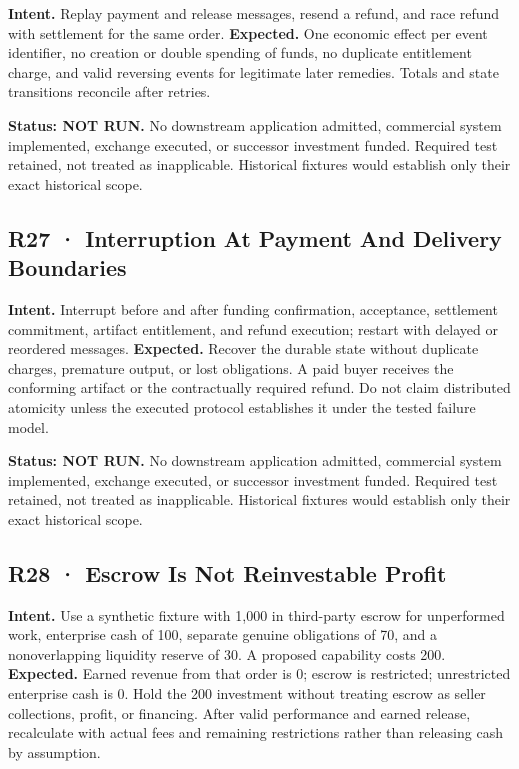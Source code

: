 \documentclass[10pt,letterpaper]{article}
\begin{document}
\textbf{Intent.} Replay payment and release messages, resend a refund,
and race refund with settlement for the same order. \textbf{Expected.}
One economic effect per event identifier, no creation or double spending
of funds, no duplicate entitlement charge, and valid reversing events
for legitimate later remedies. Totals and state transitions reconcile
after retries.

\textbf{Status: NOT RUN.} No downstream application admitted, commercial
system implemented, exchange executed, or successor investment funded.
Required test retained, not treated as inapplicable. Historical fixtures
would establish only their exact historical scope.

\hypertarget{r27-interruption-at-payment-and-delivery-boundaries}{%
\subsection{R27 · Interruption At Payment And Delivery
Boundaries}\label{r27-interruption-at-payment-and-delivery-boundaries}}

\textbf{Intent.} Interrupt before and after funding confirmation,
acceptance, settlement commitment, artifact entitlement, and refund
execution; restart with delayed or reordered messages.
\textbf{Expected.} Recover the durable state without duplicate charges,
premature output, or lost obligations. A paid buyer receives the
conforming artifact or the contractually required refund. Do not claim
distributed atomicity unless the executed protocol establishes it under
the tested failure model.

\textbf{Status: NOT RUN.} No downstream application admitted, commercial
system implemented, exchange executed, or successor investment funded.
Required test retained, not treated as inapplicable. Historical fixtures
would establish only their exact historical scope.

\hypertarget{r28-escrow-is-not-reinvestable-profit}{%
\subsection{R28 · Escrow Is Not Reinvestable
Profit}\label{r28-escrow-is-not-reinvestable-profit}}

\textbf{Intent.} Use a synthetic fixture with 1,000 in third-party
escrow for unperformed work, enterprise cash of 100, separate genuine
obligations of 70, and a nonoverlapping liquidity reserve of 30. A
proposed capability costs 200. \textbf{Expected.} Earned revenue from
that order is 0; escrow is restricted; unrestricted enterprise cash is
0. Hold the 200 investment without treating escrow as seller
collections, profit, or financing. After valid performance and earned
release, recalculate with actual fees and remaining restrictions rather
than releasing cash by assumption.
\end{document}
